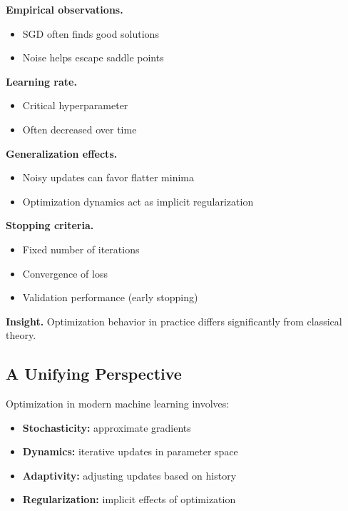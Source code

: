\medskip

\noindent
\textbf{Empirical observations.}
\begin{itemize}
    \item SGD often finds good solutions
    \item Noise helps escape saddle points
\end{itemize}

\medskip

\noindent
\textbf{Learning rate.}
\begin{itemize}
    \item Critical hyperparameter
    \item Often decreased over time
\end{itemize}

\medskip

\noindent
\textbf{Generalization effects.}
\begin{itemize}
    \item Noisy updates can favor flatter minima
    \item Optimization dynamics act as implicit regularization
\end{itemize}

\medskip

\noindent
\textbf{Stopping criteria.}
\begin{itemize}
    \item Fixed number of iterations
    \item Convergence of loss
    \item Validation performance (early stopping)
\end{itemize}

\medskip

\noindent
\textbf{Insight.}  
Optimization behavior in practice differs significantly from classical theory.

\subsection{A Unifying Perspective}

Optimization in modern machine learning involves:

\begin{itemize}
    \item \textbf{Stochasticity:} approximate gradients
    \item \textbf{Dynamics:} iterative updates in parameter space
    \item \textbf{Adaptivity:} adjusting updates based on history
    \item \textbf{Regularization:} implicit effects of optimization
\end{itemize}

